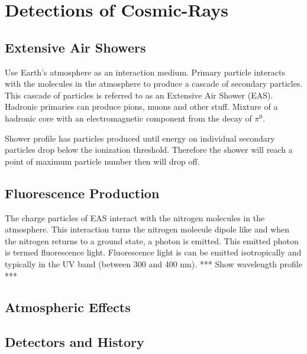 \chapter{Detections of Cosmic-Rays}\label{Ch:CR_Detection}

\section{Extensive Air Showers}

Use Earth's atmosphere as an interaction medium.
Primary particle interacts with the molecules in the atmosphere to produce a cascade of secondary particles. This cascade of particles is referred to as an Extensive Air Shower (EAS).
Hadronic primaries can produce pions, muons and other stuff.
Mixture of a hadronic core with an electromagnetic component from the decay of $\pi^{0}$.

Shower profile has particles produced until energy on individual secondary particles drop below the ionization threshold. Therefore the shower will reach a point of maximum particle number then will drop off.

\section{Fluorescence Production}

The charge particles of EAS interact with the nitrogen molecules in the atmosphere. This interaction turns the nitrogen molecule dipole like and when the nitrogen returns to a ground state, a photon is emitted. This emitted photon is termed fluorescence light. Fluorescence light is can be emitted isotropically and typically in the UV band (between 300 and 400 nm). *** Show wavelength profile ***


\section{Atmospheric Effects}




\section{Detectors and History}